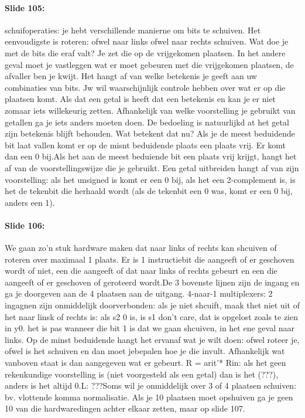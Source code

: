 \documentclass[10pt,a4paper]{book}
\begin{document}
\paragraph{Slide 105:} schuifoperaties: je hebt verschillende manierne om bits te schuiven. Het eenvoudigste is roteren: ofwel naar links ofwel naar rechts schuiven. Wat doe je met de bits die eraf valt? Je zet die op de vrijgekomen plaatsen. In het andere geval moet je vastleggen wat er moet gebeuren met die vrijgekomen plaatsen, de afvaller ben je kwijt. Het hangt af van welke betekenis je geeft aan uw combinaties van bits. Jw wil waarschijnlijk controle hebben over wat er op die plaatsen komt. Als dat een getal is heeft dat een betekenis en kan je er niet zomaar iets willekeurig zetten. Afhankelijk van welke voorstelling je gebruikt van getallen ga je iets anders moeten doen. De bedoeling is natuurlijkd at het getal zijn betekenis blijft behouden. Wat betekent dat nu? Als je de meest beduidende bit laat vallen komt er op de misnt beduidende plaats een plaats vrij. Er komt dan een 0 bij.Als het aan de meest beduiende bit een plaats vrij krijgt, hangt het af van de voorstellingswijze die je gebruikt. Een getal uitbreiden hangt af van zijn voorstelling: als het unsigned is komt er een 0 bij, als het een 2-complement is, is het de tekenbit die herhaald wordt (als de tekenbit een 0 was, komt er een 0 bij, anders een 1).

\paragraph{Slide 106:} We gaan zo'n stuk hardware maken dat naar links of rechts kan shcuiven of roteren over maximaal 1 plaats. Er is 1 instructiebit die aangeeft of er geschoven wordt of niet, een die aangeeft of dat naar links of rechts gebeurt en een die aangeeft of er geschoven of geroteerd wordt.De 3 bovenste lijnen zijn de ingang en ga je doorgeven aan de 4 plaatsen aan de uitgang. 4-naar-1 multiplexers: 2 ingagnen zijn onmiddelijk doorverbonden: als je niet shcuift, maak thet niet uit of het naar linsk of rechts is: als s2 0 is, is s1 don't care, dat is opgelost zoals te zien in y0. het is pas wanneer die bit 1 is dat we gaan shcuiven, in het ene geval naar links. Op de minst beduidende hangt het ervanaf wat je wilt doen: ofwel roteer je, ofwel is het schuiven en dan moet jebepalen hoe je die invult. Afhankelijk wat vanboven staat is dan aangegeven wat er gebeurt. R = arit'* Rin: als het geen rekenkundige voorstelling is (niet voorgesteld als een getal) dan is het (???), anders is het altijd 0.L: ???Soms wil je onmiddelijk over 3 of 4 plaatsen schuiven: bv. vlottende komma normalisatie. Als je 10 plaatsen moet opshuiven ga je geen 10 van die hardwaredingen achter elkaar zetten, maar op slide 107.
\end{document}
